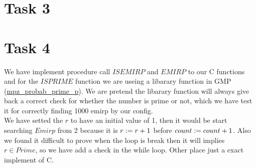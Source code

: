 \documentclass[a4paper,12pt,fleqn]{scrartcl}
\begin{document}
\section{Task 3} 


\section{Task 4}
We have implement procedure call $ISEMIRP$ and $EMIRP$ to our C functions 
and for the $ISPRIME$ function we are useing a libarary function in GMP
(\url{mpz_probab_prime_p}). We are pretend the libarary function will always
give back a correct check for whether the number is prime or not, which 
we have test it for correctly finding 1000 emirp by our config.\\
We have setted the $r$ to have an initial value of 1, then it would be start
searching $Emirp$ from 2 because it is $ r \mathrel{:=} r +1 $ before 
$ count \mathrel{:=} count +1 $. Also we found it difficult to prove when the 
loop is break then it will implies $r \in Prime$, so we have add a check 
in the while loop. Other place just a exact implement of C. 
\end{document}
